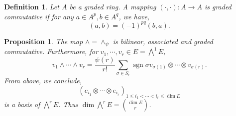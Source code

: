 \documentclass[10pt]{article}
\newtheorem{proposition}{Proposition}[section]
\newtheorem{definition}{Definition}[section]
\DeclareMathOperator{\sgn}{sgn}
\begin{document}
\begin{definition}
  Let $A$ be a graded ring. A mapping $(\cdot,\cdot):A\to A$ is graded commutative if for any $a\in A^p,b\in A^q$, we have,
  \begin{equation*}
    (a,b) = (-1)^{pq}(b,a).
  \end{equation*} 
\end{definition}

\begin{proposition}
  The map $\wedge = \wedge_\psi$ is bilinear, associated and graded commutative. Furthermore, for $v_1,\cdots,v_r\in E = \bigwedge^1E$, 
  \begin{equation*}
    v_1\wedge\cdots\wedge v_r = {\frac {\psi(r)} {r!}}\sum_{\sigma\in S_r}\sgn\sigma v_{\sigma(1)}\otimes\cdots\otimes v_{\sigma(r)}.
  \end{equation*}
  From above, we conclude,
  \begin{equation*}
    (e_{i_1}\otimes\cdots\otimes e_{i_r})_{1\leq i_1<\cdots<i_r\leq \dim E}
  \end{equation*}
  is a basis of $\bigwedge^rE$. Thus $\dim \bigwedge^r E = {\dim E\choose r}$.
\end{proposition}
\end{document}
